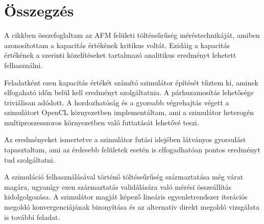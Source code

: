 \section{Összegzés}
	A cikkben összefoglaltam az AFM felületi töltéssűrűség méréstechnikáját, amiben azonosítottam a
	kapacitás értékének kritikus voltát. Ezidáig a kapacitás értékének a \cite{Hudlet1998,Butt20051}
	szerinti közelítéseket tartalmazó analitikus eredményt lehetett felhasználni.
	
	Feladatként ezen kapacitás értékét számító szimulátor építését tűztem ki, aminek elfogaható időn
	belül kell eredményt szolgáltatnia. A párhuzamosítás lehetősége triviálisan adódott.
	A hordozhatóság és a gyorsabb végrehajtás végett a szimulátort OpenCL 
	környezetben implementáltam, ami a szimulátor heterogén multiproszesszoros környezetben való
	futtatását lehetővé teszi.
	
	Az eredményeket ismertetve a szimulátor futási idejében látványos gyorsulást tapasztaltam, ami
	az érdesebb felületek esetén is elfogadhatóan pontos eredményt tud szolgáltatni. 
	
	A szimuláció felhasználásával történő töltéssűrűség származtatása még várat magára, ugyanígy ezen
	származtatás validálására való mérési összeállítás kidolgolgozása.
	A szimulátor magját képező lineáris egyenletrendszer iterációs megoldó
	konvergenciájának bizonyítása és az alternatív direkt megoldó vizsgálata is további feladat.
